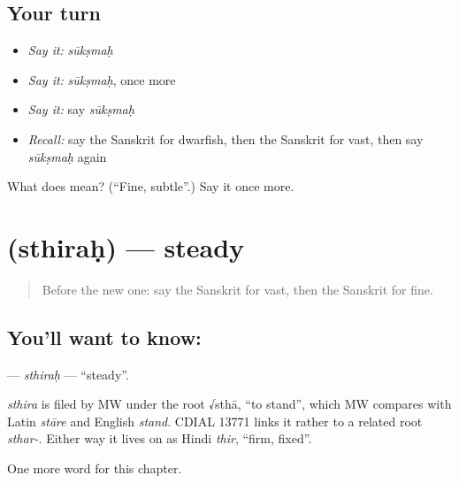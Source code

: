 \subsection*{Your turn}
\begin{itemize}
\raggedright
  \item \emph{Say it:} \emph{sūkṣmaḥ}
  \item \emph{Say it:} \emph{sūkṣmaḥ}, once more
  \item \emph{Say it:} say \emph{sūkṣmaḥ}
  \item \emph{Recall:} say the Sanskrit for dwarfish, then the Sanskrit for vast, then say \emph{sūkṣmaḥ} again
\end{itemize}

\begin{tcolorbox}[breakable,colback=teal!4,colframe=teal!35!black,title={Before you move on}]
What does  mean? (\textquotedblleft{}Fine, subtle\textquotedblright{}.) Say it once more.
\end{tcolorbox}
\section[\texorpdfstring{\sk{स्थिरः} (sthiraḥ)}{स्थिरः (sthiraḥ)}]{ (sthiraḥ) — steady}

\label{lesson:SA-C186-sthirah}



\begin{quote}
Before the new one: say the Sanskrit for vast, then the Sanskrit for fine.
\end{quote}

\subsection*{You'll want to know: }
\textbf{} — \emph{sthiraḥ} — \textquotedblleft{}steady\textquotedblright{}.

\begin{cousinweb}
\emph{sthira} is filed by MW under the root √sthā, \textquotedblleft{}to stand\textquotedblright{}, which MW compares with Latin \emph{stāre} and English \emph{stand}. CDIAL 13771 links it rather to a related root \emph{sthar-}. Either way it lives on as Hindi \emph{thir}, \textquotedblleft{}firm, fixed\textquotedblright{}.
\end{cousinweb}

\begin{grammarlens}[title={What you've built}]
One more word for this chapter.
\end{grammarlens}

